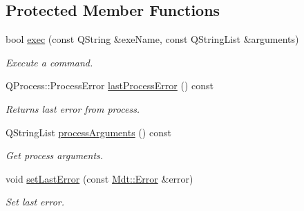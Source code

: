 \subsection*{Protected Member Functions}
\begin{DoxyCompactItemize}
\item 
bool \hyperlink{class_mdt_1_1_deploy_utils_1_1_tool_executable_wrapper_a82d75a83041420d10cb163c084e9828c}{exec} (const Q\+String \&exe\+Name, const Q\+String\+List \&arguments)\hypertarget{class_mdt_1_1_deploy_utils_1_1_tool_executable_wrapper_a82d75a83041420d10cb163c084e9828c}{}\label{class_mdt_1_1_deploy_utils_1_1_tool_executable_wrapper_a82d75a83041420d10cb163c084e9828c}

\begin{DoxyCompactList}\small\item\em Execute a command. \end{DoxyCompactList}\item 
Q\+Process\+::\+Process\+Error \hyperlink{class_mdt_1_1_deploy_utils_1_1_tool_executable_wrapper_a4a94d5952557daed5e91dafb8d4fef85}{last\+Process\+Error} () const \hypertarget{class_mdt_1_1_deploy_utils_1_1_tool_executable_wrapper_a4a94d5952557daed5e91dafb8d4fef85}{}\label{class_mdt_1_1_deploy_utils_1_1_tool_executable_wrapper_a4a94d5952557daed5e91dafb8d4fef85}

\begin{DoxyCompactList}\small\item\em Returns last error from process. \end{DoxyCompactList}\item 
Q\+String\+List \hyperlink{class_mdt_1_1_deploy_utils_1_1_tool_executable_wrapper_ab85cd91b9a6a681624119b316d503e8a}{process\+Arguments} () const \hypertarget{class_mdt_1_1_deploy_utils_1_1_tool_executable_wrapper_ab85cd91b9a6a681624119b316d503e8a}{}\label{class_mdt_1_1_deploy_utils_1_1_tool_executable_wrapper_ab85cd91b9a6a681624119b316d503e8a}

\begin{DoxyCompactList}\small\item\em Get process arguments. \end{DoxyCompactList}\item 
void \hyperlink{class_mdt_1_1_deploy_utils_1_1_tool_executable_wrapper_a13671f8e384893777fd1633dc4984244}{set\+Last\+Error} (const \hyperlink{class_mdt_1_1_error}{Mdt\+::\+Error} \&error)\hypertarget{class_mdt_1_1_deploy_utils_1_1_tool_executable_wrapper_a13671f8e384893777fd1633dc4984244}{}\label{class_mdt_1_1_deploy_utils_1_1_tool_executable_wrapper_a13671f8e384893777fd1633dc4984244}

\begin{DoxyCompactList}\small\item\em Set last error. \end{DoxyCompactList}\end{DoxyCompactItemize}


